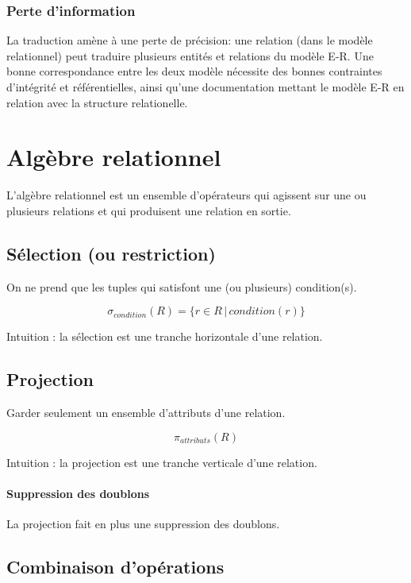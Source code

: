 \documentclass[a4paper]{article}
\begin{document}
\subsubsection{Perte d'information}
La traduction amène à une perte de précision: une relation (dans le modèle relationnel)
peut traduire plusieurs entités et relations du modèle E-R. Une bonne correspondance
entre les deux modèle nécessite des bonnes contraintes d'intégrité et référentielles,
ainsi qu'une documentation mettant le modèle E-R en relation avec la structure relationelle.



\section{Algèbre relationnel}

L'algèbre relationnel est un ensemble d'opérateurs qui agissent sur une ou plusieurs
relations et qui produisent une relation en sortie.

  \subsection{Sélection (ou restriction)}
  On ne prend que les tuples qui satisfont une (ou plusieurs) condition(s).

    $$ \sigma_{condition}(R) = \{r\in R\, |\, condition(r)\} $$

  Intuition : la sélection est une tranche horizontale d'une relation. 

  \subsection{Projection}
  Garder seulement un ensemble d'attributs d'une relation.

  $$ \pi_{attributs}(R) $$

  Intuition : la projection est une tranche verticale d'une relation.

  \paragraph{Suppression des doublons}
  La projection fait en plus une suppression des doublons.

  \subsection{Combinaison d'opérations}
\end{document}
